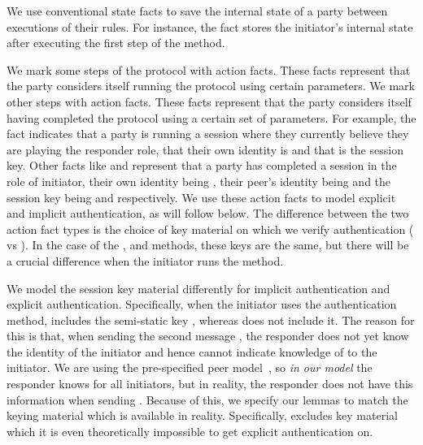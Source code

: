 We use conventional state facts to save the internal state of a party between
executions of their rules.
%
For instance, the fact \mbox{}
stores the initiator's internal state after executing the first step of the
\mPskPsk{} method.
%

We mark some steps of the protocol with  action facts.
%
These facts represent that the party considers itself running the
protocol using certain parameters.
%
We mark other steps with  action facts.
%
These facts represent that the party considers itself having
completed the protocol using a certain set of parameters.
%
For example, the fact 
indicates that a party is running a session where they currently believe
they are playing the responder role, that their own identity is 
and that  is the session key.
%
Other facts like 
%
and  represent that a party has completed
a session in the role of initiator, their own identity being , their
peer's identity being  and the session key being  and
 respectively.
%
We use these action facts to model explicit and implicit authentication, as will
follow below.
%
The difference between the two  action fact types is the choice of
key material on which we verify authentication ( vs ).
%
In the case of the \mSigSig{}, \mSigStat{} and \mPskPsk{} methods, these keys
are the same, but there will be a crucial difference when the initiator runs
the \mStat{} method.
%

We model the session key material differently for implicit authentication and
explicit authentication.
%
Specifically, when the initiator uses the \mStat{} authentication method,
 includes the semi-static key \mGiy{}, whereas  does not
include it.
%
The reason for this is that, when sending the second message \mMsgtwo{}, the
responder does not yet know the identity of the initiator and hence cannot
indicate knowledge of \mGiy{} to the initiator.
%
We are using the pre-specified peer model~\cite{sigma}, so \emph{in our model}
the responder knows \mGiy{} for all initiators, but in reality, the responder
does not have this information when sending \mMsgtwo.
%
Because of this, we specify our lemmas to match the keying material which is
available in reality.
%
Specifically,  excludes key material which it is even theoretically
impossible to get explicit authentication on.
%

